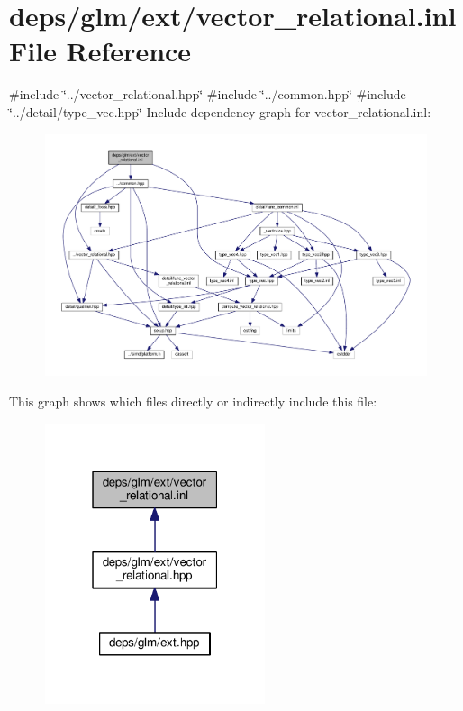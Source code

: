 \hypertarget{vector__relational_8inl}{}\section{deps/glm/ext/vector\+\_\+relational.inl File Reference}
\label{vector__relational_8inl}
{\ttfamily \#include \char`\"{}../vector\+\_\+relational.\+hpp\char`\"{}}\newline
{\ttfamily \#include \char`\"{}../common.\+hpp\char`\"{}}\newline
{\ttfamily \#include \char`\"{}../detail/type\+\_\+vec.\+hpp\char`\"{}}\newline
Include dependency graph for vector\+\_\+relational.\+inl\+:
\nopagebreak
\begin{figure}[H]
\begin{center}
\leavevmode
\includegraphics[width=350pt]{db/d92/vector__relational_8inl__incl}
\end{center}
\end{figure}
This graph shows which files directly or indirectly include this file\+:
\nopagebreak
\begin{figure}[H]
\begin{center}
\leavevmode
\includegraphics[width=183pt]{d1/d7a/vector__relational_8inl__dep__incl}
\end{center}
\end{figure}
